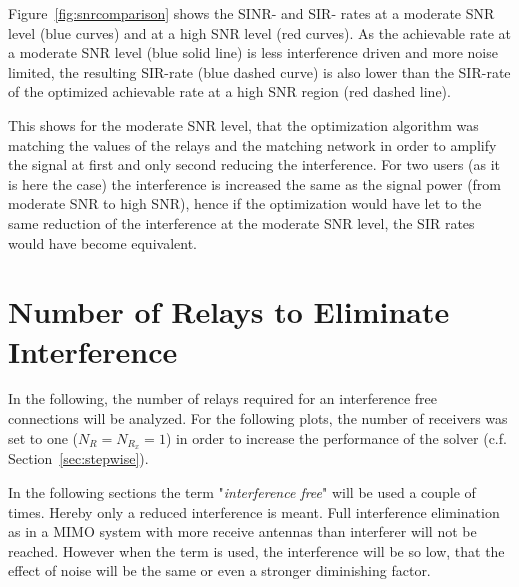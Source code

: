 Figure~\ref{fig:snrcomparison} shows the SINR- and SIR- rates at a moderate SNR level (blue curves) and at a high SNR level (red curves).
As the achievable rate at a moderate SNR level (blue solid line) is less interference driven and more noise limited, the resulting SIR-rate (blue dashed curve) is also lower than the SIR-rate of the optimized achievable rate at a high SNR region (red dashed line).

This shows for the moderate SNR level, that the optimization algorithm was matching the values of the relays and the matching network in order to amplify the signal at first and only second reducing the interference.
For two users (as it is here the case) the interference is increased the same as the signal power (from moderate SNR to high SNR), hence if the optimization would have let to the same reduction of the interference at the moderate SNR level, the SIR rates would have become equivalent.

\section{Number of Relays to Eliminate Interference}
\label{sec:interf_fix}
In the following, the number of relays required for an interference free connections will be analyzed.
For the following plots, the number of receivers was set to one ($N_{R} = N_{R_x} = 1$) in order to increase the performance of the solver (c.f. Section~\ref{sec:stepwise}).

In the following sections the term "\textit{interference free}" will be used a couple of times.
Hereby only a reduced interference is meant.
Full interference elimination as in a MIMO system with more receive antennas than interferer will not be reached.
However when the term is used, the interference will be so low, that the effect of noise will be the same or even a stronger diminishing factor.

